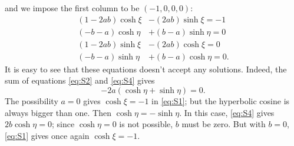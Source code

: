and we impose the first column to be $( -1,0,0,0)$:
\begin{subequations}\label{eq:S_14}
	\begin{align}
		(1-2ab)\cosh\xi & -(2ab)\sinh\xi=-1   \label{eq:S1}  \\
		(-b-a)\cosh\eta & +(b-a)\sinh\eta=0    \label{eq:S2} \\
		(1-2ab)\sinh\xi & -(2ab)\cosh\xi=0     \label{eq:S3} \\
		(-b-a)\sinh\eta & +(b-a)\cosh\eta=0.  \label{eq:S4}
	\end{align}
\end{subequations}
It is easy to see that these equations doesn't accept any solutions. Indeed, the sum of equations \eqref{eq:S2} and \eqref{eq:S4} gives
\[
	-2a(\cosh\eta+\sinh\eta)=0.
\]
The possibility $a=0$ gives $\cosh\xi=-1$ in \eqref{eq:S1}; but the hyperbolic cosine is always bigger than one. Then $\cosh\eta=-\sinh\eta$. In this case, \eqref{eq:S4} gives $2b\cosh\eta=0$; since $\cosh\eta=0$ is not possible, $b$ must be zero. But with $b=0$, \eqref{eq:S1} gives once again $\cosh\xi=-1$.

